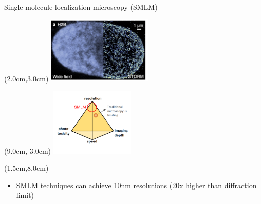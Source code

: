 \documentclass{beamer}					%
\begin{document}
\begin{frame}{Single molecule localization microscopy (SMLM)}

\begin{textblock*}{5cm}(2.0cm,3.0cm)
\includegraphics[width=5cm]{../../postdoc/sartorius/media/STORM.png}
\end{textblock*}

\begin{textblock*}{4cm}(9.0cm, 3.0cm)
\includegraphics[width=4cm]{../../postdoc/sartorius/media/Tradeoff-SMLM.png}
\end{textblock*}

\begin{textblock*}{10cm}(1.5cm,8.0cm)
\begin{itemize}
\item SMLM techniques can achieve 10nm resolutions (20x higher than diffraction limit) 
\end{itemize}
\end{textblock*}

\end{frame}
\end{document}
